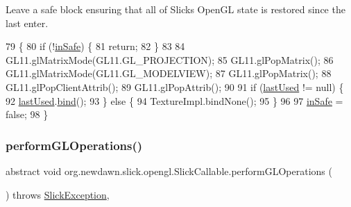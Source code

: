 Leave a safe block ensuring that all of Slick\textquotesingle{}s Open\+GL state is restored since the last enter. 
\begin{DoxyCode}
79     \{
80         \textcolor{keywordflow}{if} (!\mbox{\hyperlink{classorg_1_1newdawn_1_1slick_1_1opengl_1_1_slick_callable_a6f60853b128453504f8184a3b6f4e34b}{inSafe}}) \{
81             \textcolor{keywordflow}{return};
82         \}
83 
84         GL11.glMatrixMode(GL11.GL\_PROJECTION);
85         GL11.glPopMatrix();
86         GL11.glMatrixMode(GL11.GL\_MODELVIEW);
87         GL11.glPopMatrix();
88         GL11.glPopClientAttrib();
89         GL11.glPopAttrib();
90         
91         \textcolor{keywordflow}{if} (\mbox{\hyperlink{classorg_1_1newdawn_1_1slick_1_1opengl_1_1_slick_callable_a1b9a4b045be62c494829982f9a8671f2}{lastUsed}} != null) \{
92             \mbox{\hyperlink{classorg_1_1newdawn_1_1slick_1_1opengl_1_1_slick_callable_a1b9a4b045be62c494829982f9a8671f2}{lastUsed}}.\mbox{\hyperlink{interfaceorg_1_1newdawn_1_1slick_1_1opengl_1_1_texture_a97c02b82a8170c4c0bccb570dc872873}{bind}}();
93         \} \textcolor{keywordflow}{else} \{
94             TextureImpl.bindNone();
95         \}
96         
97         \mbox{\hyperlink{classorg_1_1newdawn_1_1slick_1_1opengl_1_1_slick_callable_a6f60853b128453504f8184a3b6f4e34b}{inSafe}} = \textcolor{keyword}{false};
98     \}
\end{DoxyCode}
\mbox{\label{classorg_1_1newdawn_1_1slick_1_1opengl_1_1_slick_callable_aa7b2c33eb1b68c7203cc9abdf6b33fc6}} 
\subsubsection{\texorpdfstring{perform\+G\+L\+Operations()}{performGLOperations()}}
{\footnotesize\ttfamily abstract void org.\+newdawn.\+slick.\+opengl.\+Slick\+Callable.\+perform\+G\+L\+Operations (\begin{DoxyParamCaption}{ }\end{DoxyParamCaption}) throws \mbox{\hyperlink{classorg_1_1newdawn_1_1slick_1_1_slick_exception}{Slick\+Exception}}\hspace{0.3cm}{\ttfamily [abstract]}, {\ttfamily [protected]}}


